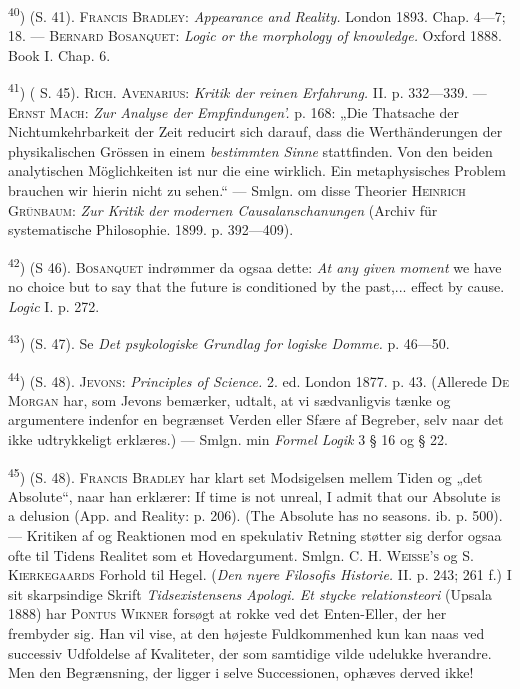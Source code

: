 \documentclass[12pt,a4paper,openany]{book}
\newcommand{\opage}[1]{\marginnote{\footnotesize\textit{[#1]}}}
\begin{document}
\begin{small}
\textsuperscript{40}) (S. 41). \textsc{Francis Bradley}: \textit{Appearance and
Reality.} London 1893. Chap. 4---7; 18. --- \textsc{Bernard Bosanquet}:
\textit{Logic or the morphology of knowledge.} Oxford 1888. Book I. Chap. 6.

\textsuperscript{41}) (
\opage{89}S. 45). \textsc{Rich. Avenarius}: \textit{Kritik der reinen
Erfahrung.} II. p. 332---339. --- \textsc{Ernst Mach}: \textit{Zur Analyse der
Empfindungen'.} p. 168: „Die Thatsache der Nichtumkehrbarkeit der Zeit reducirt
sich darauf, dass die Werthänderungen der physikalischen Grössen in einem
\textit{bestimmten Sinne} stattfinden. Von den beiden analytischen
Möglichkeiten ist nur die eine wirklich. Ein metaphysisches Problem brauchen
wir hierin nicht zu sehen.“ --- Smlgn. om disse Theorier \textsc{Heinrich}
\textsc{Grünbaum}: \textit{Zur Kritik der modernen Causalanschanungen} (Archiv
für systematische Philosophie. 1899. p. 392---409).

\textsuperscript{42}) (S 46). %
 \textsc{Bosanquet} indrømmer da ogsaa dette:\textit{ At any given moment} we
have no choice but to say that the future is conditioned by the past,... effect
by cause. \textit{Logic} I. p. 272.

\textsuperscript{43}) (S. 47). Se \textit{Det psykologiske Grundlag for logiske
Domme.} p. 46---50.

\textsuperscript{44}) (S. 48). \textsc{Jevons}: \textit{Principles of Science.}
2. ed. London 1877. p. 43. (Allerede \textsc{De Morgan} har, som Jevons
bemærker, udtalt, at vi sædvanligvis tænke og argumentere indenfor en begrænset
Verden eller Sfære af Begreber, selv naar det ikke udtrykkeligt erklæres.) ---
Smlgn. min \textit{Formel Logik} 3 § 16 og § 22.

\textsuperscript{45}) (S. 48). \textsc{Francis Bradley} har klart set
Modsigelsen mellem Tiden og „det Absolute“, naar han erklærer: If time is not
unreal, I admit that our Absolute is a delusion (App. and Reality: p. 206).
(The Absolute has no seasons. ib. p. 500). --- Kritiken af og Reaktionen mod en
spekulativ Retning støtter sig derfor ogsaa ofte til Tidens Realitet som et
Hovedargument. Smlgn. \textsc{C. H. Weisse's} og \textsc{S. Kierkegaards}
Forhold til Hegel. %
(\textit{Den nyere Filosofis Historie.} II. p. 243; 261 f.) I sit skarpsindige
Skrift \textit{Tidsexistensens Apologi. Et stycke relationsteori} (Upsala 1888)
har \textsc{Pontus Wikner} forsøgt at rokke ved det Enten-Eller, der her
frembyder sig. Han vil vise, at den højeste Fuldkommenhed kun kan naas ved
successiv Udfoldelse af Kvaliteter, der som samtidige vilde udelukke hverandre.
Men den Begrænsning, der ligger i selve Successionen, ophæves derved ikke!


\end{small}
\end{document}
